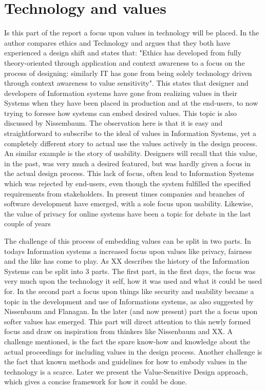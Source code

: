 
\section{Technology and values}
Is this part of the report a focus upon values in technology will be placed. In  the author compares ethics and Technology and argues that they both have experienced a design shift and states that: "Ethics has developed from fully theory-oriented through application and context awareness to a focus on the process of designing: similarly IT has gone from being solely technology driven through context awareness to value sensitivity". This states that designer and developers of Information systems have gone from realizing values in their Systems when they have been placed in production and at the end-users, to now trying to foresee how systems can embed desired values. This topic is also discussed by Nissembaum. The observation here is that it is easy and straightforward to subscribe to the ideal of values in Information Systems, yet a completely different story to actual use the values actively in the design process. An similar example is the story of usability. Designers will recall that this value, in the past, was very much a desired featured, but was hardly given a focus in the actual design process. This lack of focus, often lead to Information Systems which was rejected by end-users, even though the system fulfilled the specified requirements from stakeholders. In present times companies and branches of software development have emerged, with a sole focus upon usability. Likewise, the value of privacy for online systems have been a topic for debate in the last couple of years

The challenge of this process of embedding values can be split in two parts. 
In todays Information systems a increased focus upon values like privacy, fairness and the like has come to play. As XX describes the history of the Information Systems can be split into 3 parts. The first part, in the first days, the focus was very much upon the technology it self, how it was used and what it could be used for. In the second part a focus upon things like security and usability became a topic in the development and use of Informations systems, as also suggested by Nissenbaum and Flanagan. In the later (and now present) part the a focus upon softer values has emerged. This part will direct attention to this newly formed focus and draw on inspiration from thinkers like Nissenbaum and XX. A challenge mentioned, is the fact the spare know-how and knowledge about the actual proceedings for including values in the design process. Another challenge is the fact that known methods and guidelines for how to embody values in the technology is a scarce. Later we present the Value-Sensitive Design approach, which gives a concise framework for how it could be done. 

